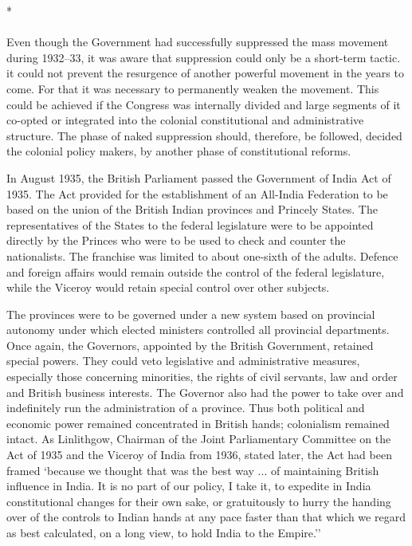 \begin{multicols}{2}
\begin{center}*\end{center}

\paragraph*{}

Even though the Government had successfully suppressed the mass movement during 1932--33, it was aware that suppression could only be a short-term tactic. it could not prevent the resurgence of another powerful movement in the years to come. For that it was necessary to permanently weaken the movement. This could be achieved if the Congress was internally divided and large segments of it co-opted or integrated into the colonial constitutional and administrative structure. The phase of naked suppression should, therefore, be followed, decided the colonial policy makers, by another phase of constitutional reforms. 

In August 1935, the British Parliament passed the Government of India Act of 1935. The Act provided for the establishment of an All-India Federation to be based on the union of the British Indian provinces and Princely States. The representatives of the States to the federal legislature were to be appointed directly by the Princes who were to be used to check and counter the nationalists. The franchise was limited to about one-sixth of the adults. Defence and foreign affairs would remain outside the control of the federal legislature, while the Viceroy would retain special control over other subjects. 

The provinces were to be governed under a new system based on provincial autonomy under which elected ministers controlled all provincial departments. Once again, the Governors, appointed by the British Government, retained special powers. They could veto legislative and administrative measures, especially those concerning minorities, the rights of civil servants, law and order and British business interests. The Governor also had the power to take over and indefinitely run the administration of a province. Thus both political and economic power remained concentrated in British hands; colonialism remained intact. As Linlithgow, Chairman of the Joint Parliamentary Committee on the Act of 1935 and the Viceroy of India from 1936, stated later, the Act had been framed `because we thought that was the best way ... of maintaining British influence in India. It is no part of our policy, I take it, to expedite in India constitutional changes for their own sake, or gratuitously to hurry the handing over of the controls to Indian hands at any pace faster than that which we regard as best calculated, on a long view, to hold India to the Empire.'' 


\end{multicols}
